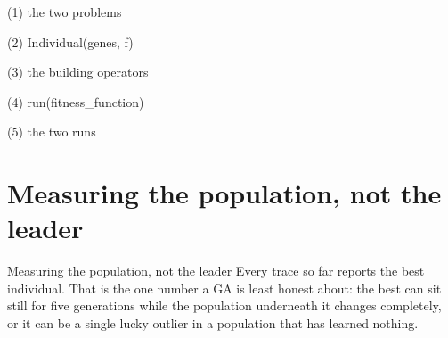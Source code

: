 \begin{frame}[fragile]{(1) the two problems}

\end{frame}

\begin{frame}[fragile]{(2) Individual(genes, f)}

\end{frame}

\begin{frame}[fragile]{(3) the building operators}

\end{frame}

\begin{frame}[fragile]{(4) run(fitness\_function)}

\end{frame}

\begin{frame}[fragile]{(5) the two runs}

\end{frame}


\section{Measuring the population, not the leader}

\begin{frame}{Measuring the population, not the leader}
Every trace so far reports the best individual. That is the one number a GA is
least honest about: the best can sit still for five generations while the
population underneath it changes completely, or it can be a single lucky outlier
in a population that has learned nothing.
\end{frame}

